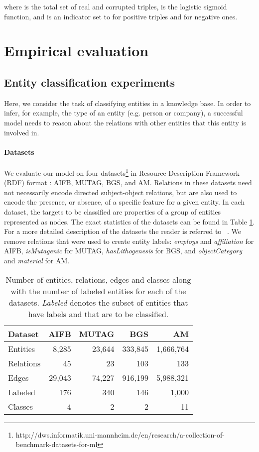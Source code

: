 \documentclass[letterpaper]{article} \usepackage{aaai18}  \usepackage{times}  \usepackage{helvet}  \usepackage{courier}  \usepackage{url}  \usepackage{graphicx}  \frenchspacing
\newcommand{\citet}[1]{\citeauthor{#1}~\shortcite{#1}}
\begin{document}
where  is the total set of real and corrupted triples,  is the logistic sigmoid function, and  is an indicator set to  for positive triples and  for negative ones.
 
\section{Empirical evaluation}

\subsection{Entity classification experiments}\label{sec:ent_exp}
Here, we consider the task of classifying entities in a knowledge base. In order to infer, for example, the type of an entity (e.g. person or company), a successful model needs to reason about the relations with other entities that this entity is involved in.

\paragraph{Datasets}
We evaluate our model on four datasets\footnote{http://dws.informatik.uni-mannheim.de/en/research/a-collection-of-benchmark-datasets-for-ml} in Resource Description Framework (RDF) format \cite{ristoski2016collection}: AIFB, MUTAG, BGS, and AM. Relations in these datasets need not necessarily encode directed subject-object relations, but are also used to encode the presence, or absence, of a specific feature for a given entity. In each dataset, the targets to be classified are properties of a group of entities represented as nodes. The exact statistics of the datasets can be found in Table \ref{table:classification_datasets}. For a more detailed description of the datasets the reader is referred to \citet{ristoski2016collection}. We remove relations that were used to create entity labels: \textit{employs} and \textit{affiliation} for AIFB, \textit{isMutagenic} for MUTAG, \textit{hasLithogenesis} for BGS, and \textit{objectCategory} and \textit{material} for AM.

\begin{table}[htp!]
\centering
\begin{tabular}{lrrrr}
\toprule
Dataset & AIFB & MUTAG & BGS & AM  \\ \midrule
Entities    & 8,285 & 23,644 & 333,845 & 1,666,764 \\
Relations   & 45 & 23 & 103 & 133 \\
Edges   & 29,043 & 74,227 & 916,199& 5,988,321 \\
Labeled  & 176 & 340 & 146 &  1,000 \\
Classes  & 4 & 2 & 2 &  11 \\

 \bottomrule
\end{tabular}
\caption{Number of entities, relations, edges and classes along with the number of labeled entities for each of the datasets. \textit{Labeled} denotes the subset of entities that have labels and that are to be classified.}
\label{table:classification_datasets}
\end{table}
\end{document}
